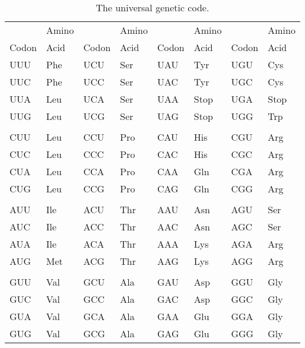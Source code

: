 \begin{table}
\begin{center}
\begin{tabular}{llllllll}
\hline\hline
      & Amino &       & Amino &       & Amino &       & Amino \\
Codon & Acid  & Codon & Acid  & Codon & Acid  & Codon & Acid \\
\hline
UUU   & Phe   & UCU   & Ser   & UAU   & Tyr   & UGU   & Cys \\
UUC   & Phe   & UCC   & Ser   & UAC   & Tyr   & UGC   & Cys \\
UUA   & Leu   & UCA   & Ser   & UAA   & Stop  & UGA   & Stop \\
UUG   & Leu   & UCG   & Ser   & UAG   & Stop  & UGG   & Trp \\
      &       &       &       &       &       &       & \\
CUU   & Leu   & CCU   & Pro   & CAU   & His   & CGU   & Arg \\
CUC   & Leu   & CCC   & Pro   & CAC   & His   & CGC   & Arg \\
CUA   & Leu   & CCA   & Pro   & CAA   & Gln   & CGA   & Arg \\
CUG   & Leu   & CCG   & Pro   & CAG   & Gln   & CGG   & Arg \\
      &       &       &       &       &       &       & \\
AUU   & Ile   & ACU   & Thr   & AAU   & Asn   & AGU   & Ser \\
AUC   & Ile   & ACC   & Thr   & AAC   & Asn   & AGC   & Ser \\
AUA   & Ile   & ACA   & Thr   & AAA   & Lys   & AGA   & Arg \\
AUG   & Met   & ACG   & Thr   & AAG   & Lys   & AGG   & Arg \\
      &       &       &       &       &       &       & \\
GUU   & Val   & GCU   & Ala   & GAU   & Asp   & GGU   & Gly \\
GUC   & Val   & GCC   & Ala   & GAC   & Asp   & GGC   & Gly \\
GUA   & Val   & GCA   & Ala   & GAA   & Glu   & GGA   & Gly \\
GUG   & Val   & GCG   & Ala   & GAG   & Glu   & GGG   & Gly \\
\hline
\end{tabular}
\end{center}
\caption{The universal genetic code.}\label{table:code}
\end{table}

